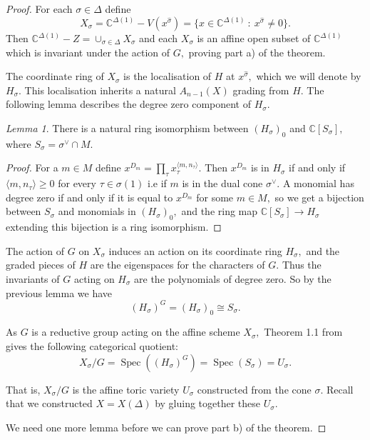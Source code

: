 \documentclass[BSc]{usydthesis}
\numberwithin{equation}{chapter}
\theoremstyle{remark}
\newtheorem{Lemma}[equation]{Lemma}
\newcommand{\C}{\mathbb{C}}
\newcommand{\V}{\vee}
\begin{document}
\begin{proof}
 For each $\sigma\in \Delta$ define $$X_{\sigma} = \C^{\Delta(1)} - V( x^{ \hat{\sigma}}) = \{ x\in \C^{\Delta(1)} \ : \ x^{\hat{\sigma}} \neq 0\}.$$ Then $\C^{\Delta(1)}-Z = \cup_{\sigma\in \Delta} X_{\sigma}$ and each $X_{\sigma}$ is an affine open subset of $\C^{\Delta(1)}$ which is invariant under the action of $G,$ proving part a) of the theorem.
 
 The coordinate ring of $X_{\sigma}$ is the localisation of $H$ at $x^{ \hat{\sigma}},$ which we will denote by $H_{\sigma}.$ This localisation inherits a natural $A_{n-1}(X)$ grading from $H.$ The following lemma describes the degree zero component of $H_{\sigma}.$
 
 \begin{Lemma}\label{FIRST}
  There is a natural ring isomorphism between $(H_{\sigma})_0$ and $\C[S_{\sigma}],$ where $S_{\sigma} = \sigma^{\V}\cap M.$
 \end{Lemma}
   \begin{proof}
For a $m\in M$ define $x^{D_m} = \prod_{\tau} x_{\tau}^{ \langle m, n_{\tau}\rangle}.$ Then $x^{D_m}$ is in $H_{\sigma}$ if and only if $\langle m,n_{\tau}\rangle \geq 0$ for every $\tau\in \sigma(1)$ i.e if $m$ is in the dual cone $\sigma^{\V}.$ A monomial has degree zero if and only if it is equal to $x^{D_m}$ for some $m\in M,$ so we get a bijection between $S_{\sigma}$ and monomials in $(H_{\sigma})_0,$ and the ring map $\C[S_{\sigma}] \to H_{\sigma}$ extending this bijection is a ring isomorphism.
    \end{proof}
 
 The action of $G$ on $X_{\sigma}$ induces an action on its coordinate ring $H_{\sigma},$ and the graded pieces of $H$ are the eigenspaces for the characters of $G.$ Thus the invariants of $G$ acting on $H_{\sigma}$ are the polynomials of degree zero. So by the previous lemma we have $$ (H_{\sigma})^G = (H_{\sigma})_0 \cong S_{\sigma}.$$
 
As $G$ is a reductive group acting on the affine scheme $X_{\sigma},$ Theorem 1.1 from \cite{GIT} gives the following categorical quotient: $$ X_{\sigma}/G = \operatorname{Spec}( (H_{\sigma})^G ) = \operatorname{Spec}( S_{\sigma}) = U_{\sigma}.$$

That is, $X_{\sigma}/G$ is the affine toric variety $U_{\sigma}$ constructed from the cone $\sigma.$ Recall that we constructed $X=X(\Delta)$ by gluing together these $U_{\sigma}.$ 

We need one more lemma before we can prove part b) of the theorem.


\end{proof}
\end{document}
